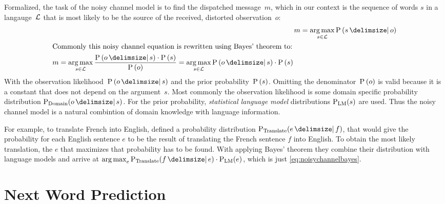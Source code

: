 Formalized, the task of the noisy channel model is to find the dispatched
message~$m$, which in our context is the sequence of words $s$ in a
langauge~$\mathcal{L}$ that is most likely to be the source of the received,
distorted observation~$o$:
\begin{align}
  \label{eq:noisychannel}
  m &= \Argmax{s \in \Language} \Prob{s}{o} \\
  \intertext{Commonly this noisy channel equation is rewritten using Bayes'
    theorem to:}
  \label{eq:noisychannelbayes}
  \begin{split}
    m &= \Argmax{s \in \Language} \frac{\Prob{o}{s} \cdot \Prob{s}}{\Prob{o}}
       = \Argmax{s \in \Language} \Prob{o}{s} \cdot \Prob{s}
  \end{split}
\end{align}
With the observation likelihood~$\Prob{o}{s}$ and the prior
probability~$\Prob{s}$.
Omitting the denominator~$\Prob{o}$ is valid because it is a constant that does
not depend on the argument~$s$.
Most commonly the observation likelihood is some domain specific probability
distribution $\Prob[\text{Domain}]{o}{s}$.
For the prior probability, \emph{statistical language model} distributions
$\Prob[\text{LM}]{s}$ are used.
Thus the noisy channel model is a natural combintion of domain knowledge with
language information.

For example, to translate French into English, \textcite{Brown1990} defined a
probability distribution $\Prob[\text{Translate}]{e}{f}$, that would give the
probability for each English sentence $e$ to be the result of translating
the French sentence $f$ into English.
To obtain the most likely translation, the $e$ that maximizes that probability
has to be found.
With applying Bayes' theorem they combine their distribution with language
models and arrive at
$\Argmax{e} \Prob[\text{Translate}]{f}{e} \cdot \Prob[\text{LM}]{e}$, which is
just \cref{eq:noisychannelbayes}.

\section{Next Word Prediction}


